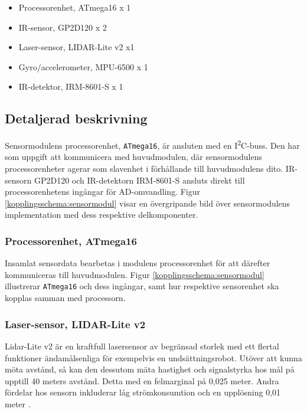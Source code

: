 \documentclass[11pt]{article}
\begin{document}
\begin{flushleft}
\begin{itemize}
\item{Processorenhet, ATmega16 x 1}
\item{IR-sensor, GP2D120 x 2}
\item{Laser-sensor, LIDAR-Lite v2 x1}
\item{Gyro/accelerometer, MPU-6500 x 1}
\item{IR-detektor, IRM-8601-S x 1}

\end{itemize}

\subsection{Detaljerad beskrivning}

Sensormodulens processorenhet, \verb+ATmega16+, är ansluten med en I\textsuperscript{2}C-buss. Den har som uppgift att kommunicera med huvudmodulen, där sensormodulens processorenheter agerar som slavenhet i förhållande till huvudmodulens dito. 
IR-sensorn GP2D120 och IR-detektorn IRM-8601-S ansluts direkt till processorenhetens ingångar för AD-omvandling. Figur \ref{kopplingsschema:sensormodul} visar en övergripande bild över sensormodulens implementation med dess respektive delkomponenter. 

\subsubsection{Processorenhet, ATmega16}
Insamlat sensordata bearbetas i modulens processorenhet för att därefter kommuniceras till huvudmodulen. Figur \ref{kopplingsschema:sensormodul} illustrerar \verb+ATmega16+ och dess ingångar, samt hur respektive sensorenhet ska kopplas samman med processorn. 

\subsubsection{Laser-sensor, LIDAR-Lite v2}
Lidar-Lite v2 är en kraftfull lasersensor av begränsad storlek med ett flertal funktioner ändamålsenliga för exempelvis en undsättningsrobot. Utöver att kunna möta avstånd, så kan den dessutom mäta hastighet och signalstyrka hos mål på upptill 40 meters avstånd. Detta med en felmarginal på 0,025 meter. Andra fördelar hos sensorn inkluderar låg strömkonsumtion och en upplösning 0,01 meter \cite{7131685}.


\end{flushleft}
\end{document}
